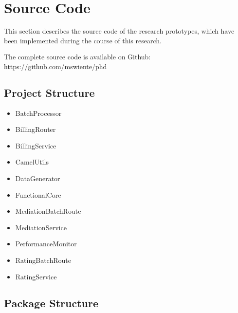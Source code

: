 \chapter{Source Code}\label{ch:appendix_source_code}

This section describes the source code of the research prototypes, which have been implemented during the course of this research.

The complete source code is available on Github: https://github.com/mswiente/phd

\section{Project Structure}

\begin{itemize}
	\item BatchProcessor
	\item BillingRouter
	\item BillingService
	\item CamelUtils
	\item DataGenerator
	\item FunctionalCore
	\item MediationBatchRoute
	\item MediationService
	\item PerformanceMonitor
	\item RatingBatchRoute
	\item RatingService
\end{itemize}

\section{Package Structure}